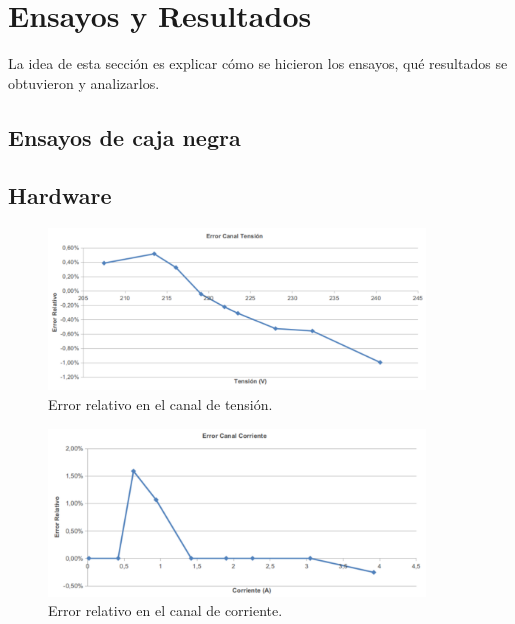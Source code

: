 
\chapter{Ensayos y Resultados} %

\label{Chapter4} %


La idea de esta sección es explicar cómo se hicieron los ensayos, qué resultados se obtuvieron y analizarlos.

\section{Ensayos de caja negra}

\section{Hardware}

\begin{figure}[h]
	\centering
	\includegraphics[width=10cm]{./Figures/4_1_1_error_canal_tension.pdf}
	\caption{Error relativo en el canal de tensión.}
	\label{fig:error_canal_tensión}
\end{figure}

\begin{figure}[h]
	\centering
	\includegraphics[width=10cm]{./Figures/4_1_1_error_canal_corriente.pdf}
	\caption{Error relativo en el canal de corriente.}
	\label{fig:error_canal_corriente}
\end{figure}

